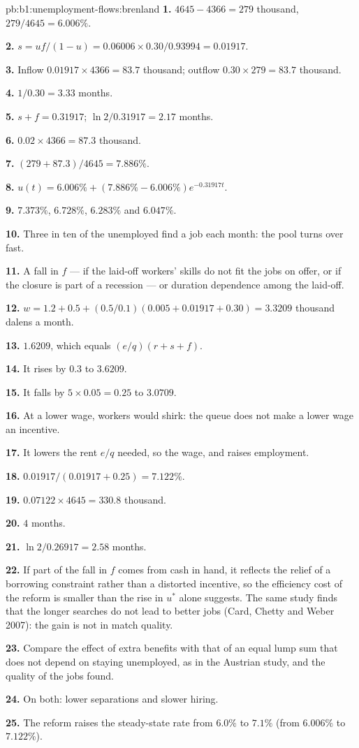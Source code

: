 \begin{solution}{pb:b1:unemployment-flows:brenland}
\textbf{1.} $4645 - 4366 = 279$ thousand, $279/4645 = 6.006\%$.

\textbf{2.} $s = uf/(1 - u) = 0.06006 \times 0.30/0.93994 = 0.01917$.

\textbf{3.} Inflow $0.01917 \times 4366 = 83.7$ thousand; outflow $0.30 \times 279 = 83.7$ thousand.

\textbf{4.} $1/0.30 = 3.33$ months.

\textbf{5.} $s + f = 0.31917$;  $\ln 2/0.31917 = 2.17$ months.

\textbf{6.} $0.02 \times 4366 = 87.3$ thousand.

\textbf{7.} $(279 + 87.3)/4645 = 7.886\%$.

\textbf{8.} $u(t) = 6.006\% + (7.886\% - 6.006\%)e^{-0.31917t}$.

\textbf{9.} $7.373\%$, $6.728\%$, $6.283\%$ and $6.047\%$.

\textbf{10.} Three in ten of the unemployed find a job each month: the pool
turns over fast.

\textbf{11.} A fall in $f$ --- if the laid-off workers' skills do not fit the
jobs on offer, or if the closure is part of a recession --- or duration
dependence among the laid-off.

\textbf{12.} $w = 1.2 + 0.5 + (0.5/0.1)(0.005 + 0.01917 + 0.30) = 3.3209$ thousand dalens a month.

\textbf{13.} $1.6209$, which equals $(e/q)(r + s + f)$.

\textbf{14.} It rises by $0.3$ to $3.6209$.

\textbf{15.} It falls by $5 \times 0.05 = 0.25$ to $3.0709$.

\textbf{16.} At a lower wage, workers would shirk: the queue does not make a
lower wage an incentive.

\textbf{17.} It lowers the rent $e/q$ needed, so the wage, and raises employment.

\textbf{18.} $0.01917/(0.01917 + 0.25) = 7.122\%$.

\textbf{19.} $0.07122 \times 4645 = 330.8$ thousand.

\textbf{20.} $4$ months.

\textbf{21.} $\ln 2/0.26917 = 2.58$ months.

\textbf{22.} If part of the fall in $f$ comes from cash in hand, it reflects
the relief of a borrowing constraint rather than a distorted incentive, so
the efficiency cost of the reform is smaller than the rise in $u^*$ alone
suggests. The same study finds that the longer searches do not lead to
better jobs (Card, Chetty and Weber 2007): the gain is not in match
quality. %

\textbf{23.} Compare the effect of extra benefits with that of an equal
lump sum that does not depend on staying unemployed, as in the Austrian
study, and the quality of the jobs found.

\textbf{24.} On both: lower separations and slower hiring.

\textbf{25.} The reform raises the steady-state rate from $6.0\%$ to $7.1\%$ (from
$6.006\%$ to $7.122\%$).
\end{solution}
